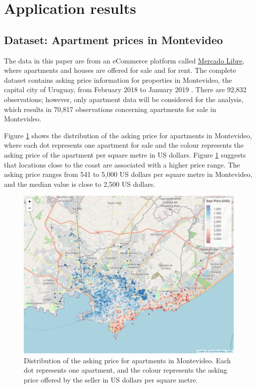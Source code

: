 \documentclass[smallextended,natbib]{svjour3}\usepackage[]{graphicx}\usepackage[]{xcolor}
\newcommand{\1}[1]{\mathbbm{1}_{#1}}
\begin{document}
\section{Application results}
\label{section:appl}

\subsection{Dataset: Apartment prices in Montevideo}
The data in this paper are from an eCommerce platform called \href{https://www.mercadolibre.com.uy)}{Mercado Libre}, where apartments and houses are offered for sale and for rent. The complete dataset contains asking price information for properties in Montevideo, the capital city of Uruguay, from February 2018 to January 2019 \citep{Picardo}. There are 92,832 observations; however, only apartment data will be considered for the analysis, which results in 70,817 observations concerning apartments for sale in Montevideo.

 Figure \ref{mapa} shows the distribution of the asking price for apartments in Montevideo, where each dot represents one apartment for sale and the colour represents the asking price of the apartment per square metre in US dollars. Figure \ref{mapa} suggests that locations close to the coast are associated with a higher price range. The asking price ranges from 541 to 5,000 US dollars per square metre in Montevideo, and the median value is close to 2,500 US dollars.  
 \begin{figure}[hbpt]
\centering
\includegraphics[width=1\linewidth]{figures/mapa_preciom2.png}
\caption{Distribution of the asking price for apartments in Montevideo. Each dot represents one apartment, and the colour represents the asking price offered by the seller in US dollars per square metre. 
\label{mapa} }
\end{figure}
\end{document}
